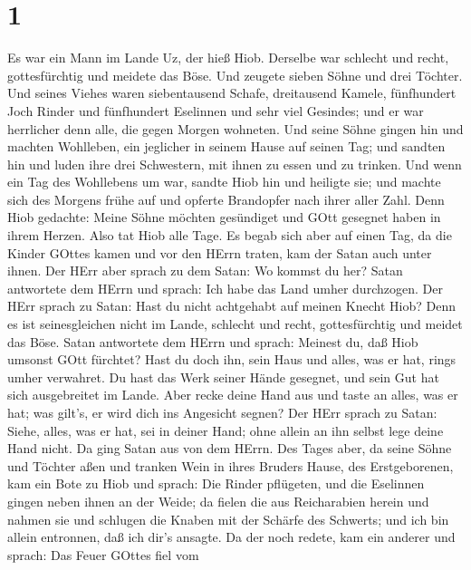 \hypertarget{section}{%
\section{1}\label{section}}

 Es war ein Mann im Lande Uz, der hieß Hiob. Derselbe war
schlecht und recht, gottesfürchtig und meidete das Böse. 
Und zeugete sieben Söhne und drei Töchter.  Und seines
Viehes waren siebentausend Schafe, dreitausend Kamele, fünfhundert Joch
Rinder und fünfhundert Eselinnen und sehr viel Gesindes; und er war
herrlicher denn alle, die gegen Morgen wohneten.  Und seine
Söhne gingen hin und machten Wohlleben, ein jeglicher in seinem Hause
auf seinen Tag; und sandten hin und luden ihre drei Schwestern, mit
ihnen zu essen und zu trinken.  Und wenn ein Tag des
Wohllebens um war, sandte Hiob hin und heiligte sie; und machte sich des
Morgens frühe auf und opferte Brandopfer nach ihrer aller Zahl. Denn
Hiob gedachte: Meine Söhne möchten gesündiget und GOtt gesegnet haben in
ihrem Herzen. Also tat Hiob alle Tage.  Es begab sich aber
auf einen Tag, da die Kinder GOttes kamen und vor den HErrn traten, kam
der Satan auch unter ihnen.  Der HErr aber sprach zu dem
Satan: Wo kommst du her? Satan antwortete dem HErrn und sprach: Ich habe
das Land umher durchzogen.  Der HErr sprach zu Satan: Hast
du nicht achtgehabt auf meinen Knecht Hiob? Denn es ist seinesgleichen
nicht im Lande, schlecht und recht, gottesfürchtig und meidet das Böse.
 Satan antwortete dem HErrn und sprach: Meinest du, daß Hiob
umsonst GOtt fürchtet?  Hast du doch ihn, sein Haus und
alles, was er hat, rings umher verwahret. Du hast das Werk seiner Hände
gesegnet, und sein Gut hat sich ausgebreitet im Lande. 
Aber recke deine Hand aus und taste an alles, was er hat; was gilt's, er
wird dich ins Angesicht segnen?  Der HErr sprach zu Satan:
Siehe, alles, was er hat, sei in deiner Hand; ohne allein an ihn selbst
lege deine Hand nicht. Da ging Satan aus von dem HErrn. 
Des Tages aber, da seine Söhne und Töchter aßen und tranken Wein in
ihres Bruders Hause, des Erstgeborenen,  kam ein Bote zu
Hiob und sprach: Die Rinder pflügeten, und die Eselinnen gingen neben
ihnen an der Weide;  da fielen die aus Reicharabien herein
und nahmen sie und schlugen die Knaben mit der Schärfe des Schwerts; und
ich bin allein entronnen, daß ich dir's ansagte.  Da der
noch redete, kam ein anderer und sprach: Das Feuer GOttes fiel vom
